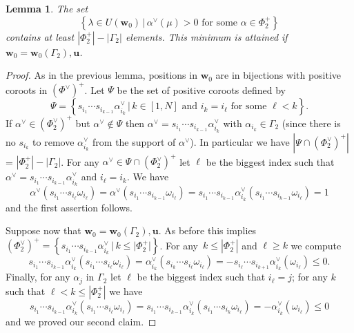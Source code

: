 \documentclass[a4paper]{amsart}
\newtheorem{lemma}[theorem]{Lemma}
\theoremstyle{definition}
\newcommand{\bfu}{\mathbf{u}}
\newcommand{\bfw}{\mathbf{w}}
\begin{document}
\begin{lemma}
  \label{lem: u-weights}
  The set
  \[
    \left\{\lambda\in U(\bfw_0) \,|\, \alpha^\vee(\mu) > 0 \mbox{ for some } \alpha\in\Phi^+_2\right\}
  \]
  contains at least $|\Phi^+_2|-|\Gamma_2|$ elements.
 This minimum is attained if $\bfw_0=\bfw_0(\Gamma_2),\bfu$.
\end{lemma}
\begin{proof}
  As in the previous lemma, positions in $\bfw_0$ are in bijections with positive coroots in $\left(\Phi^\vee\right)^+$.
  Let $\Psi$ be the set of positive coroots defined by
  \[
    \Psi
    =
    \left\{s_{i_1}\cdots s_{i_{k-1}} \alpha_{i_k}^\vee\,|\,k\in[1,N] \mbox{ and } i_k = i_\ell \mbox{ for some }\ell < k \right\}.
  \]
  If $\alpha^\vee \in \left(\Phi_2^\vee\right)^+$ but $\alpha^\vee \not \in \Psi$ then $\alpha^\vee= s_{i_1}\cdots s_{i_{k-1}} \alpha_{i_k}^\vee$ with $\alpha_{i_k}\in\Gamma_2$ (since there is no $s_{i_k}$ to remove $\alpha_{i_k}^\vee$ from the support of $\alpha^\vee$).
  In particular we have $\left|\Psi\cap\left(\Phi_2^\vee\right)^+\right|$ = $\left|\Phi_2^+\right|-\left|\Gamma_2\right|$.
  For any $\alpha^\vee\in \Psi\cap\left(\Phi_2^\vee\right)^+$ let $\ell$ be the biggest index such that $\alpha^\vee= s_{i_1}\cdots s_{i_{k-1}} \alpha_{i_k}^\vee$ and $i_\ell = i_k$.
  We have
  \[
    \alpha^\vee(s_{i_1}\cdots s_{i_\ell} \omega_{i_{\ell}})
    =
    \alpha^\vee(s_{i_1}\cdots s_{i_{k-1}} \omega_{i_{\ell}})
    =
    s_{i_1}\cdots s_{i_{k-1}} \alpha_{i_k}^\vee(s_{i_1}\cdots s_{i_{k-1}} \omega_{i_{\ell}})
    =
    1
  \]
  and the first assertion follows.

  Suppose now that $\bfw_0=\bfw_0(\Gamma_2),\bfu$.
  As before this implies $\left(\Phi_2^\vee\right)^+=\left\{s_{i_1}\cdots s_{i_{k-1}} \alpha_{i_k}^\vee \, |\, k\leq|\Phi_2^+|\right\}$.
  For any~$k\leq|\Phi_2^+|$ and $\ell \geq k$ we compute
  \[
    s_{i_1}\cdots s_{i_{k-1}} \alpha_{i_k}^\vee(s_{i_1}\cdots s_{i_\ell} \omega_{i_\ell} )
    =
    \alpha_{i_k}^\vee(s_{i_k}\cdots s_{i_\ell} \omega_{i_\ell})
    =
    -s_{i_\ell}\cdots s_{i_{k+1}}\alpha_{i_k}^\vee( \omega_{i_\ell} )
    \leq
    0.
  \]
  Finally, for any $\alpha_j$ in $\Gamma_2$ let $\ell$ be the biggest index such that $i_\ell=j$; for any $k$ such that $\ell<k\leq\left|\Phi_2^+\right|$ we have 
  \[
    s_{i_1}\cdots s_{i_{k-1}} \alpha_{i_k}^\vee(s_{i_1}\cdots s_{i_\ell} \omega_{i_\ell} )
    =
    s_{i_1}\cdots s_{i_{k-1}} \alpha_{i_k}^\vee(s_{i_1}\cdots s_{i_k} \omega_{i_\ell} )
    =
    - \alpha_{i_k}^\vee(\omega_{i_\ell} )
    \leq
    0
  \]
  and we proved our second claim.
\end{proof}
\end{document}
